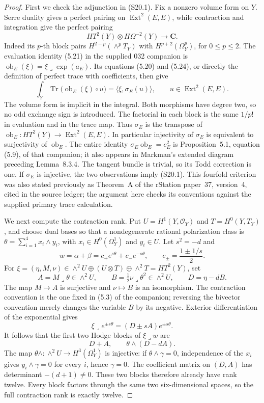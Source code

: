 \begin{proof}
First we check the adjunction in (S20.1). Fix a nonzero volume
form on $Y$. Serre duality gives a perfect pairing on
$\operatorname{Ext}^2(E,E)$, while contraction and integration
give the perfect pairing
\[
 HT^2(Y)\otimes H\Omega^{-2}(Y)\longrightarrow\mathbf C.
\]
Indeed its $p$-th block pairs
$H^{2-p}(\wedge^pT_Y)$ with $H^{p+2}(\Omega_Y^p)$,
for $0\le p\le2$.
The evaluation identity (5.21) in the supplied 032 companion
is $\operatorname{ob}_E(\xi)=\xi\mathbin{\lrcorner}
\exp(a_E)$. Its equations (5.20) and (5.24), or directly the
definition of perfect trace with coefficients, then give
\[
 \int_Y\operatorname{Tr}
       \bigl(\operatorname{ob}_E(\xi)\circ u\bigr)
   =\langle\xi,\sigma_E(u)\rangle,
 \qquad u\in\operatorname{Ext}^2(E,E).
\]
The volume form is implicit in the integral. Both morphisms
have degree two, so no odd exchange sign is introduced.
The factorial in each block is the same $1/p!$ in evaluation
and in the trace map. Thus $\sigma_E$ is the transpose of
$\operatorname{ob}_E:HT^2(Y)\to\operatorname{Ext}^2(E,E)$.
In particular injectivity of $\sigma_E$ is equivalent to
surjectivity of $\operatorname{ob}_E$.
The entire identity
$\sigma_E\operatorname{ob}_E=c_E^2$ is Proposition~5.1,
equation (5.9), of that companion; it also appears in Markman's
extended diagram preceding Lemma~8.3.4. The tangent bundle
is trivial, so its Todd correction is one.
If $\sigma_E$ is injective, the two observations imply
(S20.1). This fourfold criterion was also stated previously
as Theorem~A of the rStation paper~37, version~4, cited in the
source ledger; the argument here checks its conventions
against the supplied primary trace calculation.

We next compute the contraction rank. Put
$U=H^1(Y,\mathcal O_Y)$ and $T=H^0(Y,T_Y)$, and choose
dual bases so that a nondegenerate rational polarization
class is $\theta=\sum_{i=1}^4 x_i\wedge y_i$, with
$x_i\in H^0(\Omega_Y^1)$ and $y_i\in U$.
Let $s^2=-d$ and
\[
 w=\alpha+\beta
   =c_+e^{s\theta}+c_-e^{-s\theta},
 \qquad c_\pm=\frac{1\pm1/s}{2}.
\]
For
$\xi=(\eta,M,\nu)\in\wedge^2U\oplus(U\otimes T)
\oplus\wedge^2T=HT^2(Y)$, set
\[
 A=M\mathbin{\lrcorner}\theta\in\wedge^2U,
 \qquad B=\tfrac12\nu\mathbin{\lrcorner}\theta^2
             \in\wedge^2U,
 \qquad D=\eta-dB.
\]
The map $M\mapsto A$ is surjective and $\nu\mapsto B$ is
an isomorphism. The contraction convention is the one fixed
in (5.3) of the companion; reversing the bivector convention
merely changes the variable $B$ by its negative.
Exterior differentiation of the exponential gives
\[
 \xi\mathbin{\lrcorner}e^{\pm s\theta}
      =(D\pm sA)e^{\pm s\theta}.
\]
It follows that the first two Hodge blocks of
$\xi\mathbin{\lrcorner}w$ are
\[
 D+A,\qquad\theta\wedge(D-dA).
\]
The map $\theta\wedge:\wedge^2U\to H^3(\Omega_Y^1)$
is injective: if $\theta\wedge\gamma=0$, independence of
the $x_i$ gives $y_i\wedge\gamma=0$ for every $i$, hence
$\gamma=0$. The coefficient matrix on $(D,A)$ has
determinant $-(d+1)\ne0$. These two blocks therefore already
have rank twelve. Every block factors through the same two
six-dimensional spaces, so the full contraction rank is
exactly twelve.


\end{proof}
